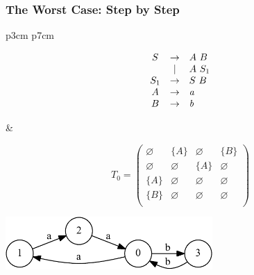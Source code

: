 \documentclass[xcolor=table]{beamer}
\begin{document}
\begin{frame}
  \frametitle{The Worst Case: Step by Step}
\begin{tabular}{p{3cm} p{7cm} }
\begin{figure}[h]
   \[
\begin{array}{ccl}
    S & \rightarrow & A \ B \\
      & | & A \ S_1 \\
    S_1 & \rightarrow & S \ B \\
    A & \rightarrow & \text{\emph{a}} \\
    B & \rightarrow & \text{\emph{b}} \\
\end{array}
\]
\label{ProductionRulesExampleQueryCNF}
\end{figure}

&

\begin{figure}[h]
\[
T_0 = \begin{pmatrix}
    \varnothing & \{A\}       & \varnothing & \{B\}       \\
    \varnothing & \varnothing & \{A\}       & \varnothing \\
    \{A\}       & \varnothing & \varnothing & \varnothing \\
    \{B\}       & \varnothing & \varnothing & \varnothing \\
\end{pmatrix}
\]

\end{figure}
 \end{tabular}

\begin{center}
  \includegraphics[height=2cm]{pictures/example_graph.pdf}
\end{center}

\end{frame}
\end{document}
